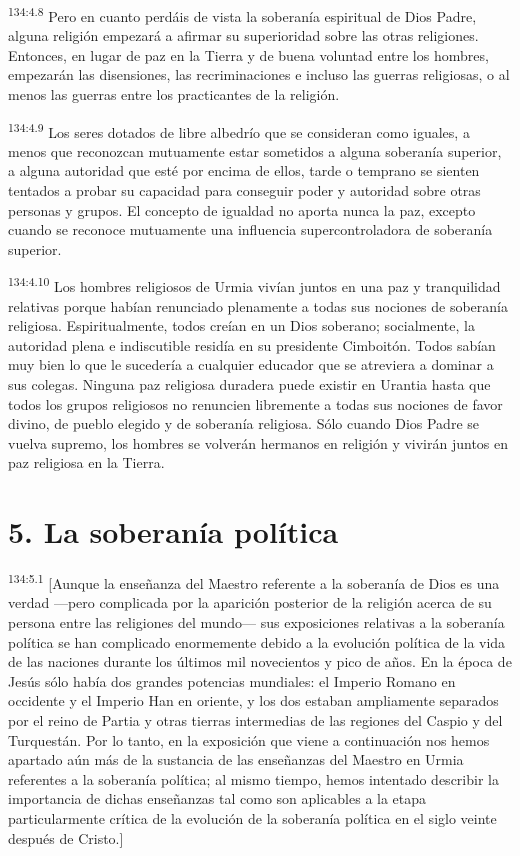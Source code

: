 \par
\textsuperscript{134:4.8} Pero en cuanto perdáis de vista la soberanía espiritual de Dios Padre, alguna religión empezará a afirmar su superioridad sobre las otras religiones. Entonces, en lugar de paz en la Tierra y de buena voluntad entre los hombres, empezarán las disensiones, las recriminaciones e incluso las guerras religiosas, o al menos las guerras entre los practicantes de la religión.

\par
\textsuperscript{134:4.9} Los seres dotados de libre albedrío que se consideran como iguales, a menos que reconozcan mutuamente estar sometidos a alguna soberanía superior, a alguna autoridad que esté por encima de ellos, tarde o temprano se sienten tentados a probar su capacidad para conseguir poder y autoridad sobre otras personas y grupos. El concepto de igualdad no aporta nunca la paz, excepto cuando se reconoce mutuamente una influencia supercontroladora de soberanía superior.

\par
\textsuperscript{134:4.10} Los hombres religiosos de Urmia vivían juntos en una paz y tranquilidad relativas porque habían renunciado plenamente a todas sus nociones de soberanía religiosa. Espiritualmente, todos creían en un Dios soberano; socialmente, la autoridad plena e indiscutible residía en su presidente Cimboitón. Todos sabían muy bien lo que le sucedería a cualquier educador que se atreviera a dominar a sus colegas. Ninguna paz religiosa duradera puede existir en Urantia hasta que todos los grupos religiosos no renuncien libremente a todas sus nociones de favor divino, de pueblo elegido y de soberanía religiosa. Sólo cuando Dios Padre se vuelva supremo, los hombres se volverán hermanos en religión y vivirán juntos en paz religiosa en la Tierra.

\section*{5. La soberanía política}
\par
\textsuperscript{134:5.1} [Aunque la enseñanza del Maestro referente a la soberanía de Dios es una verdad ---pero complicada por la aparición posterior de la religión acerca de su persona entre las religiones del mundo--- sus exposiciones relativas a la soberanía política se han complicado enormemente debido a la evolución política de la vida de las naciones durante los últimos mil novecientos y pico de años. En la época de Jesús sólo había dos grandes potencias mundiales: el Imperio Romano en occidente y el Imperio Han en oriente, y los dos estaban ampliamente separados por el reino de Partia y otras tierras intermedias de las regiones del Caspio y del Turquestán. Por lo tanto, en la exposición que viene a continuación nos hemos apartado aún más de la sustancia de las enseñanzas del Maestro en Urmia referentes a la soberanía política; al mismo tiempo, hemos intentado describir la importancia de dichas enseñanzas tal como son aplicables a la etapa particularmente crítica de la evolución de la soberanía política en el siglo veinte después de Cristo.]


